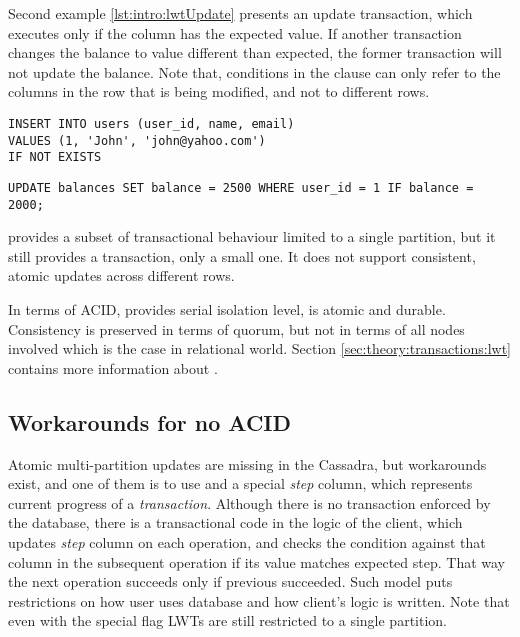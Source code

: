 Second example \ref{lst:intro:lwtUpdate} presents an update transaction, which executes only if the  column has the expected value. If another transaction changes the balance to value different than expected, the former transaction will not update the balance. Note that, conditions in the \lwt {} clause can only refer to the columns in the row that is being modified, and not to different rows.

\begin{example}
\label{lst:intro:lwtInsert}
\begin{lstlisting}[style=outcode,caption={LWT Insert with if not exists clause}]
INSERT INTO users (user_id, name, email)  
VALUES (1, 'John', 'john@yahoo.com') 
IF NOT EXISTS
\end{lstlisting}
\end{example}

\begin{example}
\label{lst:intro:lwtUpdate}
\begin{lstlisting}[style=outcode,caption={LWT Update with column condition}]
UPDATE balances SET balance = 2500 WHERE user_id = 1 IF balance = 2000;
\end{lstlisting}
\end{example}


\lwt provides a subset of transactional behaviour limited to a single partition, but it still provides a transaction, only a small one. It does not support consistent, atomic updates across different rows. 

In terms of ACID, \lwt provides serial isolation level, is atomic and durable.
Consistency is preserved in terms of quorum, but not in terms of all nodes involved which is the case in relational world. Section \ref{sec:theory:transactions:lwt} contains more information about \lwt.

\subsection{Workarounds for no ACID}
Atomic multi-partition updates are missing in the Cassadra, but workarounds exist, and one of them is to use \lwt and a special \emph{step} column, which represents current progress of a \emph{transaction}. Although there is no transaction enforced by the database, there is a transactional code in the logic of the client, which updates \emph{step} column on each operation, and checks the condition against that column in the subsequent operation if its value matches expected step. That way the next operation succeeds only if previous succeeded. Such model puts restrictions on how user uses database and how client's logic is written. Note that even with the special flag LWTs are still restricted to a single partition.  

